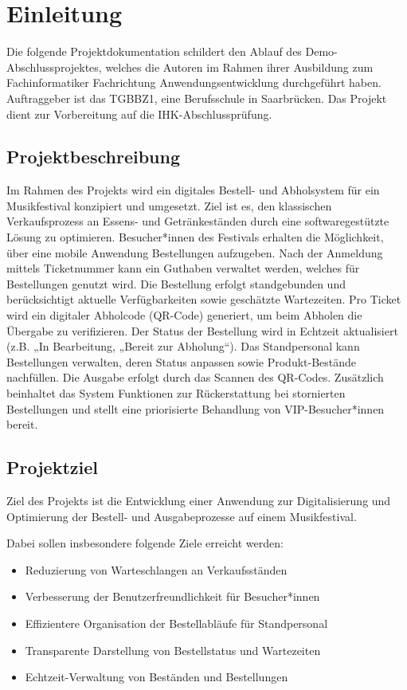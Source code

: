 \section{Einleitung}
\label{sec:Einleitung}
Die folgende Projektdokumentation schildert den Ablauf des Demo-Abschlussprojektes, welches
die Autoren im Rahmen ihrer Ausbildung zum Fachinformatiker Fachrichtung Anwendungsentwicklung 
durchgeführt haben. Auftraggeber ist das TGBBZ1, eine Berufsschule in Saarbrücken. Das Projekt
dient zur Vorbereitung auf die IHK-Abschlussprüfung. 

\subsection{Projektbeschreibung} 
\label{sec:Projektbeschreibung}
Im Rahmen des Projekts wird ein digitales Bestell- und Abholsystem für ein Musikfestival
konzipiert und umgesetzt. Ziel ist es, den klassischen Verkaufsprozess an Essens- und
Getränkeständen durch eine softwaregestützte Lösung zu optimieren. Besucher*innen des
Festivals erhalten die Möglichkeit, über eine mobile Anwendung Bestellungen aufzugeben.
Nach der Anmeldung mittels Ticketnummer kann ein Guthaben verwaltet werden, welches für
Bestellungen genutzt wird. Die Bestellung erfolgt standgebunden und berücksichtigt
aktuelle Verfügbarkeiten sowie geschätzte Wartezeiten. Pro Ticket wird ein digitaler
Abholcode (\acs{QR}-Code) generiert, um beim Abholen die Übergabe zu verifizieren. Der Status
der Bestellung wird in Echtzeit aktualisiert (z.B. „In Bearbeitung, „Bereit zur Abholung“).
Das Standpersonal kann Bestellungen verwalten, deren Status anpassen sowie Produkt-Bestände
nachfüllen. Die Ausgabe erfolgt durch das Scannen des \acs{QR}-Codes. Zusätzlich beinhaltet das
System Funktionen zur Rückerstattung bei stornierten Bestellungen und stellt eine priorisierte
Behandlung von \acs{VIP}-Besucher*innen bereit.

\subsection{Projektziel} 
\label{sec:Projektziel}
Ziel des Projekts ist die Entwicklung einer Anwendung zur Digitalisierung und Optimierung
der Bestell- und Ausgabeprozesse auf einem Musikfestival.

Dabei sollen insbesondere folgende Ziele erreicht werden:

\begin{itemize}
    \item Reduzierung von Warteschlangen an Verkaufsständen
    \item Verbesserung der Benutzerfreundlichkeit für Besucher*innen
    \item Effizientere Organisation der Bestellabläufe für Standpersonal
    \item Transparente Darstellung von Bestellstatus und Wartezeiten
    \item Echtzeit-Verwaltung von Beständen und Bestellungen
\end{itemize}

